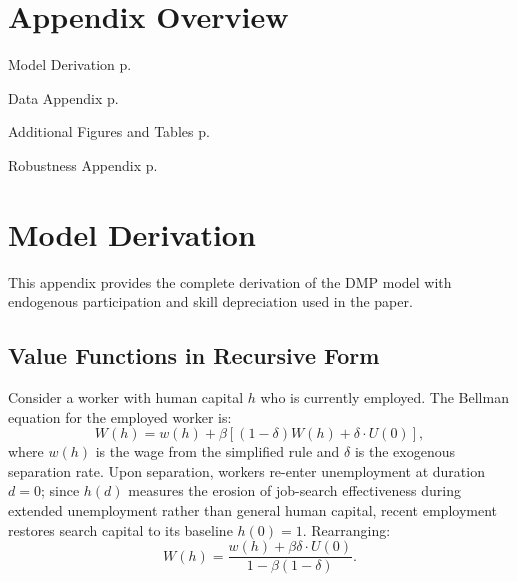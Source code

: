\documentclass[12pt]{article}
\begin{document}
\newpage
\appendix

\section*{Appendix Overview}
\vspace{-0.5em}
\begin{description}[leftmargin=2em, labelwidth=1.5em]
  \item[\ref{app:model}] Model Derivation \dotfill p.\,\pageref{app:model}
  \item[\ref{app:data}] Data Appendix \dotfill p.\,\pageref{app:data}
  \item[\ref{app:additional}] Additional Figures and Tables \dotfill p.\,\pageref{app:additional}
  \item[\ref{app:robustness}] Robustness Appendix \dotfill p.\,\pageref{app:robustness}
\end{description}

\section{Model Derivation}
\label{app:model}

This appendix provides the complete derivation of the DMP model with endogenous participation and skill depreciation used in the paper.

\subsection{Value Functions in Recursive Form}

Consider a worker with human capital $h$ who is currently employed. The Bellman equation for the employed worker is:
\begin{equation}
W(h) = w(h) + \beta \left[ (1 - \delta) W(h) + \delta \cdot U(0) \right],
\label{eq:app_W}
\end{equation}
where $w(h)$ is the wage from the simplified rule and $\delta$ is the exogenous separation rate. Upon separation, workers re-enter unemployment at duration $d = 0$; since $h(d)$ measures the erosion of job-search effectiveness during extended unemployment rather than general human capital, recent employment restores search capital to its baseline $h(0) = 1$. Rearranging:
\begin{equation}
W(h) = \frac{w(h) + \beta \delta \cdot U(0)}{1 - \beta(1 - \delta)}.
\label{eq:app_W_solved}
\end{equation}
\end{document}
